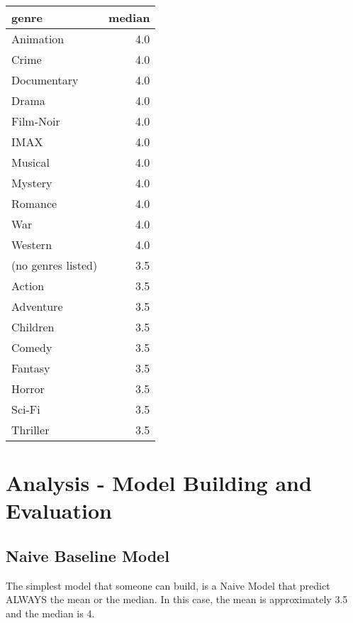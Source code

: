 \documentclass[]{article}
\newenvironment{Shaded}{}{}
\newcommand{\KeywordTok}[1]{\textcolor[rgb]{0.00,0.44,0.13}{\textbf{#1}}}
\newcommand{\NormalTok}[1]{#1}
\newcommand{\OperatorTok}[1]{\textcolor[rgb]{0.40,0.40,0.40}{#1}}
\newcommand{\StringTok}[1]{\textcolor[rgb]{0.25,0.44,0.63}{#1}}
\begin{document}
\begin{table}[H]
\centering\begingroup\fontsize{10}{12}\selectfont

\begin{tabular}{l|r}
\hline
genre & median\\
\hline
Animation & 4.0\\
\hline
Crime & 4.0\\
\hline
Documentary & 4.0\\
\hline
Drama & 4.0\\
\hline
Film-Noir & 4.0\\
\hline
IMAX & 4.0\\
\hline
Musical & 4.0\\
\hline
Mystery & 4.0\\
\hline
Romance & 4.0\\
\hline
War & 4.0\\
\hline
Western & 4.0\\
\hline
(no genres listed) & 3.5\\
\hline
Action & 3.5\\
\hline
Adventure & 3.5\\
\hline
Children & 3.5\\
\hline
Comedy & 3.5\\
\hline
Fantasy & 3.5\\
\hline
Horror & 3.5\\
\hline
Sci-Fi & 3.5\\
\hline
Thriller & 3.5\\
\hline
\end{tabular}
\endgroup{}
\end{table}

\hypertarget{analysis---model-building-and-evaluation}{%
\section{Analysis - Model Building and
Evaluation}\label{analysis---model-building-and-evaluation}}

\hypertarget{naive-baseline-model}{%
\subsection{Naive Baseline Model}\label{naive-baseline-model}}

The simplest model that someone can build, is a Naive Model that predict
ALWAYS the mean or the median. In this case, the mean is approximately
3.5 and the median is 4.

\begin{Shaded}
\end{Shaded}
\end{document}
